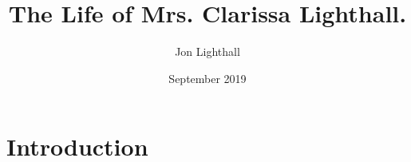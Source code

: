 \documentclass{article}
\title{The Life of Mrs. Clarissa Lighthall.}
\author{Jon Lighthall}
\date{September 2019}
\begin{document}
\maketitle

\section{Introduction}
\end{document}
